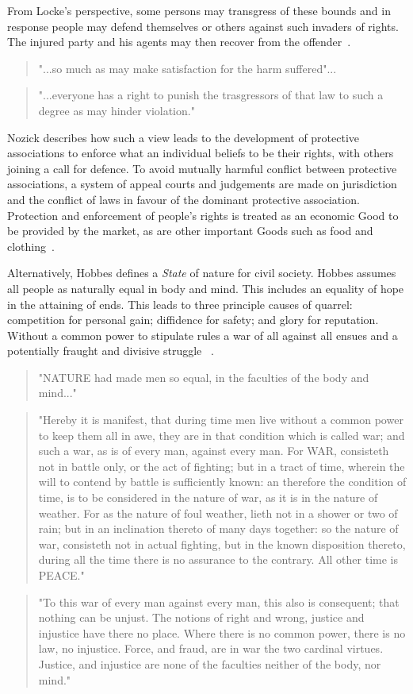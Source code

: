 \documentclass[11pt, oneside]{article}   	%
\begin{document}
From Locke's perspective, some persons may transgress of these bounds and in response people may defend themselves or others against such invaders of rights.
The injured party and his agents may then recover from the offender~\cite{jl1}.

\begin{quote}
"...so much as may make satisfaction for the harm suffered"...
\end{quote}
\begin{quote}
"...everyone has a right to punish the trasgressors of that law to such a degree as may hinder violation."
\end{quote}

Nozick describes how such a view leads to the development of protective associations to enforce what an individual beliefs to be their rights, with others joining a call for defence.
To avoid mutually harmful conflict between protective associations, a system of appeal courts and judgements are made on jurisdiction and the conflict of laws in favour of the dominant protective association.
Protection and enforcement of people's rights is treated as an economic Good to be provided by the market, as are other important Goods such as food and clothing~\cite{rn1}.\

Alternatively, Hobbes defines a \emph{State} of nature for civil society.
Hobbes assumes all people as naturally equal in body and mind.
This includes an equality of hope in the attaining of ends.
This leads to three principle causes of quarrel: competition for personal gain; diffidence for safety; and glory for reputation. Without a common power to stipulate rules a war of all against all ensues and a potentially fraught and divisive struggle ~\cite{th1}.

\begin{quote}
"NATURE had made men so equal, in the faculties of the body and mind..."
\end{quote}
\begin{quote}
"Hereby it is manifest, that during time men live without a common power to keep them all in awe, they are in that condition which is called war; and such a war, as is of every man, against every man. For WAR, consisteth not in battle only, or the act of fighting; but in a tract of time, wherein the will to contend by battle is sufficiently known: an therefore the condition of time, is to be considered in the nature of war, as it is in the nature of weather. For as the nature of foul weather, lieth not in a shower or two of rain; but in an inclination thereto of many days together: so the nature of war, consisteth not in actual fighting, but in the known disposition thereto, during all the time there is no assurance to the contrary. All other time is PEACE."
\end{quote}
\begin{quote}
"To this war of every man against every man, this also is consequent; that nothing can be unjust. The notions of right and wrong, justice and injustice have there no place. Where there is no common power, there is no law, no injustice. Force, and fraud, are in war the two cardinal virtues. Justice, and injustice are none of the faculties neither of the body, nor mind."
\end{quote}
\end{document}
